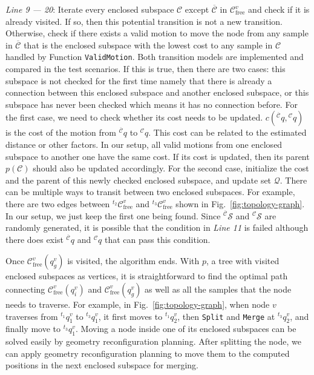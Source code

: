 \documentclass[journal]{IEEEtran}
\begin{document}
\textit{Line 9 --- 20}: Iterate every enclosed subspace $\mathcal{C}$
except $\overline{\mathcal{C}}$ in $\mathcal{C}_{\mathrm{free}}^v$ and
check if it is already visited. If so, then this potential transition
is not a new transition. Otherwise, check if there exists a valid
motion to move the node from any sample in $\overline{\mathcal{C}}$
that is the enclosed subspace with the lowest cost to any sample in
$\mathcal{C}$ handled by Function \texttt{ValidMotion}. Both
transition models are implemented and compared in the test
scenarios. If this is true, then there are two cases: this subspace is
not checked for the first time namely that there is already a
connection between this enclosed subspace and another enclosed
subspace, or this subspace has never been checked which means it has
no connection before. For the first case, we need to check whether its
cost needs to be updated.
$c({^{\overline{\mathcal{C}}}}q, {^{\mathcal{C}}}q)$ is the cost of
the motion from ${^{\overline{\mathcal{C}}}}q$ to
${^{\mathcal{C}}}q$. This cost can be related to the estimated
distance or other factors. In our setup, all valid motions from one
enclosed subspace to another one have the same cost. If its cost is
updated, then its parent $p(\mathcal{C})$ should also be updated
accordingly. For the second case, initialize the cost and the parent
of this newly checked enclosed subspace, and update set
$\mathcal{Q}$. There can be multiple ways to transit between two
enclosed subspaces. For example, there are two edges between
$^{t_2}\mathcal{C}_{\mathrm{free}}^v$ and
$^{t_3}\mathcal{C}_{\mathrm{free}}^v$ shown in
Fig.~\ref{fig:topology-graph}. In our setup, we just keep the first
one being found. Since ${^{\overline{{\mathcal{C}}}}}\mathcal{S}$ and
$^{\mathcal{C}}\mathcal{S}$ are randomly generated, it is possible
that the condition in \textit{Line 11} is failed although there does
exist $^{\overline{\mathcal{C}}}q$ and $^{\mathcal{C}}q$ that can pass
this condition.

Once $\mathcal{C}_{\mathrm{free}}^v(q_g^v)$ is visited, the algorithm
ends. With $p$, a tree with visited enclosed subspaces as vertices, it
is straightforward to find the optimal path connecting
$\mathcal{C}_{\mathrm{free}}^v(q_i^v)$ and
$\mathcal{C}_{\mathrm{free}}^v(q_g^v)$ as well as all the samples that
the node needs to traverse. For example, in
Fig.~\ref{fig:topology-graph}, when node $v$ traverses from
$^{t_1}q_1^v$ to $^{t_3}q_1^v$, it first moves to $^{t_1}q_2^v$, then
\texttt{Split} and \texttt{Merge} at $^{t_3}q_2^v$, and finally move
to $^{t_3}q_1^v$. Moving a node inside one of its enclosed subspaces
can be solved easily by geometry reconfiguration planning. After
splitting the node, we can apply geometry reconfiguration planning to
move them to the computed positions in the next enclosed subspace for
merging.
\end{document}
